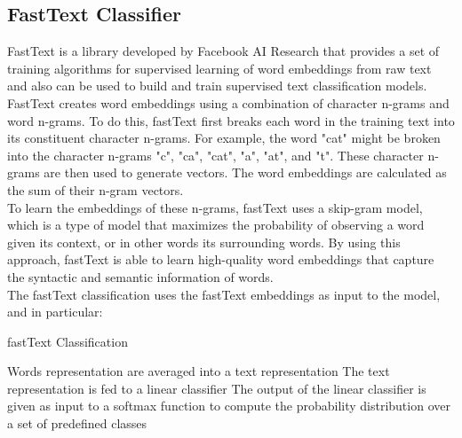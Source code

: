 \subsection{FastText Classifier}
FastText is a library developed by Facebook AI Research that provides a set of training algorithms for supervised learning of word embeddings from raw text and also can be used to build and train supervised text classification models. \\
FastText creates word embeddings using a combination of character n-grams and word n-grams. To do this, fastText first breaks each word in the training text into its constituent character n-grams. For example, the word "cat" might be broken into the character n-grams "c", "ca", "cat", "a", "at", and "t". These character n-grams are then used to generate vectors. The word embeddings are calculated as the sum of their n-gram vectors. \\
To learn the embeddings of these n-grams, fastText uses a skip-gram model, which is a type of model that maximizes the probability of observing a word given its context, or in other words its surrounding words. By using this approach, fastText is able to learn high-quality word embeddings that capture the syntactic and semantic information of words. \\
The fastText classification uses the fastText embeddings as input to the model, and in particular:
\begin{algorithm}
    \caption*{fastText Classification}
    \begin{algorithmic}[1]
      \State Words representation are averaged into a text representation
      \State The text representation is fed to a linear classifier
      \State The output of the linear classifier is given as input to a softmax function to compute the probability distribution over a set of predefined classes
    \end{algorithmic}
\end{algorithm}


